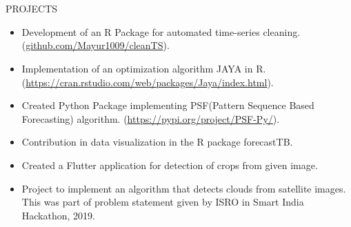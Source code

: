 \documentclass{my_cv}
\begin{document}
\section{\faProjectDiagram}{PROJECTS}
	\begin{itemize}[noitemsep]
		\item Development of an R Package for automated time-series cleaning. (\url{github.com/Mayur1009/cleanTS}).
		\item Implementation of an optimization algorithm JAYA in R. (\url{https://cran.rstudio.com/web/packages/Jaya/index.html}).
		\item Created Python Package implementing PSF(Pattern Sequence Based Forecasting) algorithm. (\url{https://pypi.org/project/PSF-Py/}).
		\item Contribution in data visualization in the R package forecastTB.
		\item Created a Flutter application for detection of crops from given image.
		\item Project to implement an algorithm that detects clouds from satellite images. This was part of problem statement given by ISRO in Smart India Hackathon, 2019.
		
	\end{itemize}
\end{document}
